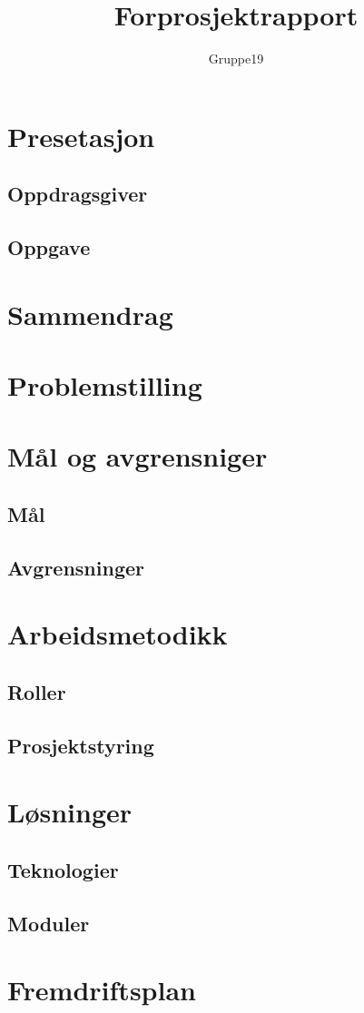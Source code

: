 \documentclass[11pt,a4paper,titlepage]{report}
\author{Gruppe19}
\title{Forprosjektrapport}
\begin{document}
\maketitle
\tableofcontents

\chapter{Presetasjon}
\section{Oppdragsgiver}
\section{Oppgave}


\chapter{Sammendrag}


\chapter{Problemstilling}


\chapter{Mål og avgrensniger}
\section{Mål}
\section{Avgrensninger}


\chapter{Arbeidsmetodikk}
\section{Roller}
\section{Prosjektstyring}



\chapter{Løsninger}
\section{Teknologier}
\section{Moduler}



\appendix
\chapter{Fremdriftsplan}
\end{document}
